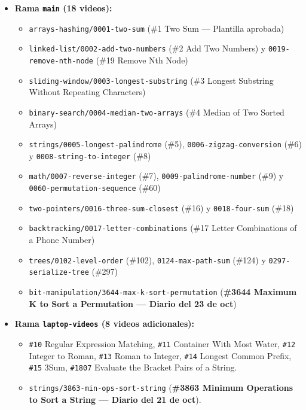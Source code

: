 \documentclass[letterpaper,10pt]{article}
\begin{document}
\begin{itemize}\setlength{\itemsep}{2pt}
  \item \textbf{Rama \texttt{main} (18 videos):}
  \begin{itemize}\setlength{\itemsep}{1pt}
    \item \texttt{arrays-hashing/0001-two-sum} (\#1 Two Sum --- Plantilla aprobada)
    \item \texttt{linked-list/0002-add-two-numbers} (\#2 Add Two Numbers) y \texttt{0019-remove-nth-node} (\#19 Remove Nth Node)
    \item \texttt{sliding-window/0003-longest-substring} (\#3 Longest Substring Without Repeating Characters)
    \item \texttt{binary-search/0004-median-two-arrays} (\#4 Median of Two Sorted Arrays)
    \item \texttt{strings/0005-longest-palindrome} (\#5), \texttt{0006-zigzag-conversion} (\#6) y \texttt{0008-string-to-integer} (\#8)
    \item \texttt{math/0007-reverse-integer} (\#7), \texttt{0009-palindrome-number} (\#9) y \texttt{0060-permutation-sequence} (\#60)
    \item \texttt{two-pointers/0016-three-sum-closest} (\#16) y \texttt{0018-four-sum} (\#18)
    \item \texttt{backtracking/0017-letter-combinations} (\#17 Letter Combinations of a Phone Number)
    \item \texttt{trees/0102-level-order} (\#102), \texttt{0124-max-path-sum} (\#124) y \texttt{0297-serialize-tree} (\#297)
    \item \texttt{bit-manipulation/3644-max-k-sort-permutation} (\textbf{\#3644 Maximum K to Sort a Permutation --- Diario del 23 de oct})
  \end{itemize}
  \item \textbf{Rama \texttt{laptop-videos} (8 videos adicionales):}
  \begin{itemize}\setlength{\itemsep}{1pt}
    \item \texttt{\#10} Regular Expression Matching, \texttt{\#11} Container With Most Water, \texttt{\#12} Integer to Roman, \texttt{\#13} Roman to Integer, \texttt{\#14} Longest Common Prefix, \texttt{\#15} 3Sum, \texttt{\#1807} Evaluate the Bracket Pairs of a String.
    \item \texttt{strings/3863-min-ops-sort-string} (\textbf{\#3863 Minimum Operations to Sort a String --- Diario del 21 de oct}).
  \end{itemize}
\end{itemize}
\end{document}
